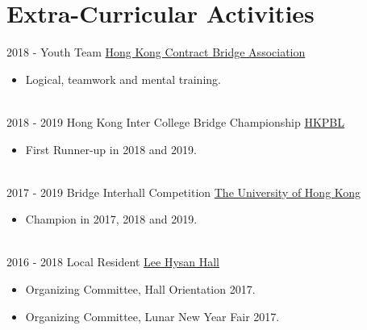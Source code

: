 \documentclass[letterpaper]{twentysecondcv} %
\begin{document}
\section{Extra-Curricular Activities}{\Large \faTrophy}
\vspace{-0.25cm}
\begin{twenty}
	\twentyitemshorttest
			{2018 - }
			{}
			{Youth Team}
			{\href{http://www.hkcba.org}{Hong Kong Contract Bridge Association}}
			{}
			{\vspace{-2mm}\begin{itemize}[topsep=0pt,partopsep=0pt]
			 \item Logical, teamwork and mental training.
			\end{itemize}} \\
	\twentyitemshorttest
			{2018 - 2019}
			{}
			{Hong Kong Inter College Bridge Championship}
			{\href{http://www.hkcba.org/hkpbl.php}{HKPBL}}
			{}
			{\vspace{-2mm}\begin{itemize}[topsep=0pt,partopsep=0pt]
			 \item First Runner-up in 2018 and 2019.
			\end{itemize}} \\
			
	\twentyitemshorttest
    	{2017 - 2019}
		{}
        {Bridge Interhall Competition}
        {\href{https://www.hku.hk}{The University of Hong Kong}}
        {}
        {\vspace{-2mm}\begin{itemize}[topsep=0pt,partopsep=0pt]
        \item Champion in 2017, 2018 and 2019.
        	\end{itemize}} \\
	
	\twentyitemshorttest
			{2016 - 2018}
			{}
			{Local Resident}
			{\href{http://www.leehysan.hku.hk}{Lee Hysan Hall}}
			{}
			{\vspace{-2mm}\begin{itemize}[topsep=0pt,partopsep=0pt]
		        \item Organizing Committee, Hall Orientation 2017.
		        \item Organizing Committee, Lunar New Year Fair 2017.
			\end{itemize}}
\end{twenty}
\end{document}
